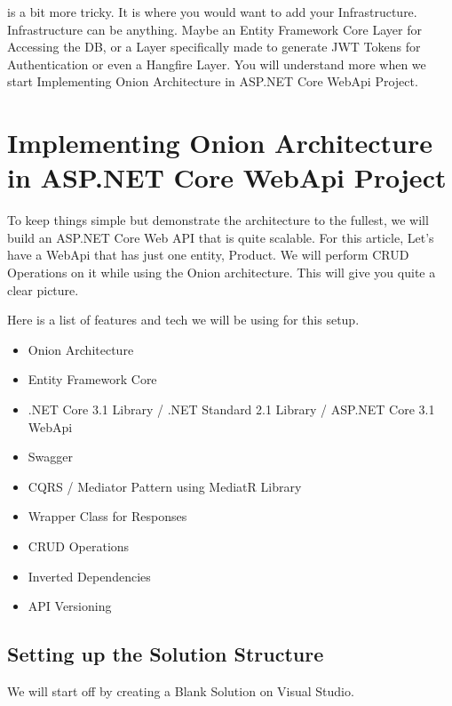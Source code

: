 \documentclass[letterpaper,10pt,english]{sphinxmanual}
\begin{document}
 is a bit more tricky. It is where you would want to add your Infrastructure. Infrastructure can be anything. Maybe an Entity Framework Core Layer for Accessing the DB, or a Layer specifically made to generate JWT Tokens for Authentication or even a Hangfire Layer. You will understand more when we start Implementing Onion Architecture in ASP.NET Core WebApi Project.


\chapter{Implementing Onion Architecture in ASP.NET Core WebApi Project}
\label{\detokenize{OnionArchitecture/details:implementing-onion-architecture-in-asp-net-core-webapi-project}}
To keep things simple but demonstrate the architecture to the fullest, we will build an ASP.NET Core Web API that is quite scalable. For this article, Let’s have a WebApi that has just one entity, Product. We will perform CRUD Operations on it while using the Onion architecture. This will give you quite a clear picture.

Here is a list of features and tech we will be using for this setup.
\begin{itemize}
\item {} 
Onion Architecture

\item {} 
Entity Framework Core

\item {} 
.NET Core 3.1 Library / .NET Standard 2.1 Library / ASP.NET Core 3.1 WebApi

\item {} 
Swagger

\item {} 
CQRS / Mediator Pattern using MediatR Library

\item {} 
Wrapper Class for Responses

\item {} 
CRUD Operations

\item {} 
Inverted Dependencies

\item {} 
API Versioning

\end{itemize}


\section{Setting up the Solution Structure}
\label{\detokenize{OnionArchitecture/details:setting-up-the-solution-structure}}
We will start off by creating a Blank Solution on Visual Studio.
\end{document}

